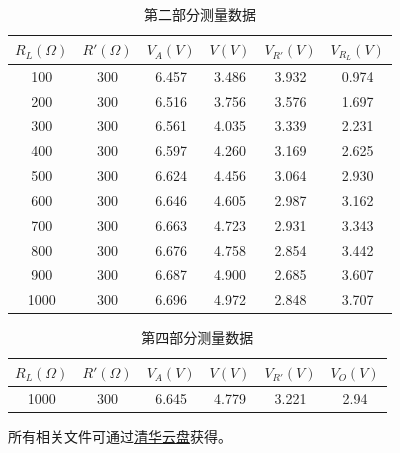 \documentclass[12pt]{article}
\begin{document}
\begin{table}[H]
    \centering
    \begin{tabular}{|c|c|c|c|c|c|}
    \hline
    $R_L(\Omega)$ & $R'(\Omega)$ & $V_A(V)$ & $V(V)$ & $V_{R'}(V)$ & $V_{R_L}(V)$ \\ \hline
    100           & 300          & 6.457    & 3.486  & 3.932       & 0.974        \\ \hline
    200           & 300          & 6.516    & 3.756  & 3.576       & 1.697        \\ \hline
    300           & 300          & 6.561    & 4.035  & 3.339       & 2.231        \\ \hline
    400           & 300          & 6.597    & 4.260  & 3.169       & 2.625        \\ \hline
    500           & 300          & 6.624    & 4.456  & 3.064       & 2.930        \\ \hline
    600           & 300          & 6.646    & 4.605  & 2.987       & 3.162        \\ \hline
    700           & 300          & 6.663    & 4.723  & 2.931       & 3.343        \\ \hline
    800           & 300          & 6.676    & 4.758  & 2.854       & 3.442        \\ \hline
    900           & 300          & 6.687    & 4.900  & 2.685       & 3.607        \\ \hline
    1000          & 300          & 6.696    & 4.972  & 2.848       & 3.707        \\ \hline
    \end{tabular}
    \caption{第二部分测量数据}
    \label{tab:A2}
\end{table}

\begin{table}[H]
    \centering
    \begin{tabular}{|c|c|c|c|c|c|}
    \hline
    $R_L (\Omega)$ & $R' (\Omega)$ & $V_A (V)$ & $V (V)$ & $V_{R'} (V)$ & $V_O (V)$ \\ \hline
    1000           & 300           & 6.645     & 4.779   & 3.221        & 2.94      \\ \hline
    \end{tabular}
    \caption{第四部分测量数据}
    \label{tab:A3}
\end{table}

所有相关文件可通过\href{https://cloud.tsinghua.edu.cn/d/8cefbd2d2132481b8647/}{清华云盘}获得。
\end{document}
